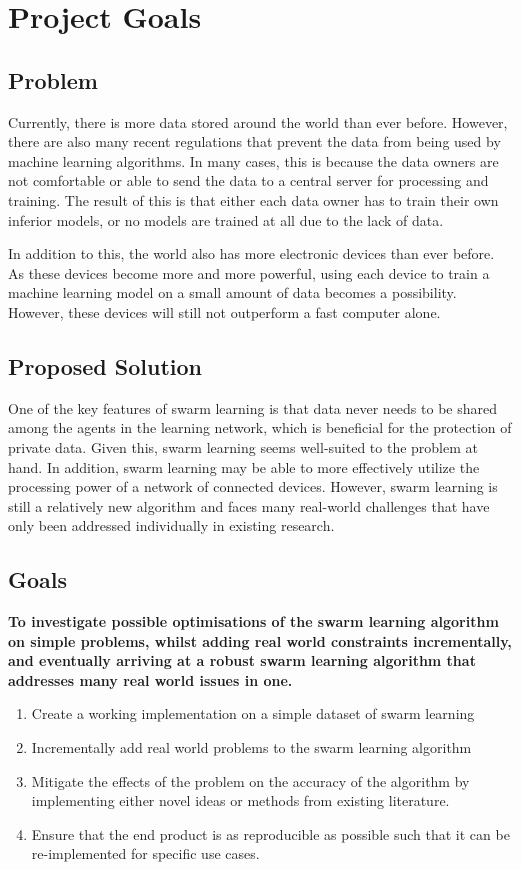 \chapter{Project Goals}
\section{Problem}
Currently, there is more data stored around the world than ever before. However, there are also many recent regulations that prevent the data from being used by machine learning algorithms. In many cases, this is because the data owners are not comfortable or able to send the data to a central server for processing and training. The result of this is that either each data owner has to train their own inferior models, or no models are trained at all due to the lack of data.

In addition to this, the world also has more electronic devices than ever before. As these devices become more and more powerful, using each device to train a machine learning model on a small amount of data becomes a possibility. However, these devices will still not outperform a fast computer alone.

\section{Proposed Solution}
One of the key features of swarm learning is that data never needs to be shared among the agents in the learning network, which is beneficial for the protection of private data. Given this, swarm learning seems well-suited to the problem at hand. In addition, swarm learning may be able to more effectively utilize the processing power of a network of connected devices. However, swarm learning is still a relatively new algorithm and faces many real-world challenges that have only been addressed individually in existing research.

\section{Goals}
\textbf{To investigate possible optimisations of the swarm learning algorithm on simple problems, whilst adding real world constraints incrementally, and eventually arriving at a robust swarm learning algorithm that addresses many real world issues in one.}

\begin{enumerate}
	\item Create a working implementation on a simple dataset of swarm learning
	\item Incrementally add real world problems to the swarm learning algorithm
	\item Mitigate the effects of the problem on the accuracy of the algorithm by implementing either novel ideas or methods from existing literature.
	\item Ensure that the end product is as reproducible as possible such that it can be re-implemented for specific use cases.
\end{enumerate}
